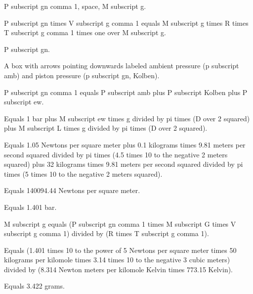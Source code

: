 P subscript gn comma 1, space, M subscript g.

P subscript gn times V subscript g comma 1 equals M subscript g times R times T subscript g comma 1 times one over M subscript g.

P subscript gn.

A box with arrows pointing downwards labeled ambient pressure (p subscript amb) and piston pressure (p subscript gn, Kolben).

P subscript gn comma 1 equals P subscript amb plus P subscript Kolben plus P subscript ew.

Equals 1 bar plus M subscript ew times g divided by pi times (D over 2 squared) plus M subscript L times g divided by pi times (D over 2 squared).

Equals 1.05 Newtons per square meter plus 0.1 kilograms times 9.81 meters per second squared divided by pi times (4.5 times 10 to the negative 2 meters squared) plus 32 kilograms times 9.81 meters per second squared divided by pi times (5 times 10 to the negative 2 meters squared).

Equals 140094.44 Newtons per square meter.

Equals 1.401 bar.

M subscript g equals (P subscript gn comma 1 times M subscript G times V subscript g comma 1) divided by (R times T subscript g comma 1).

Equals (1.401 times 10 to the power of 5 Newtons per square meter times 50 kilograms per kilomole times 3.14 times 10 to the negative 3 cubic meters) divided by (8.314 Newton meters per kilomole Kelvin times 773.15 Kelvin).

Equals 3.422 grams.